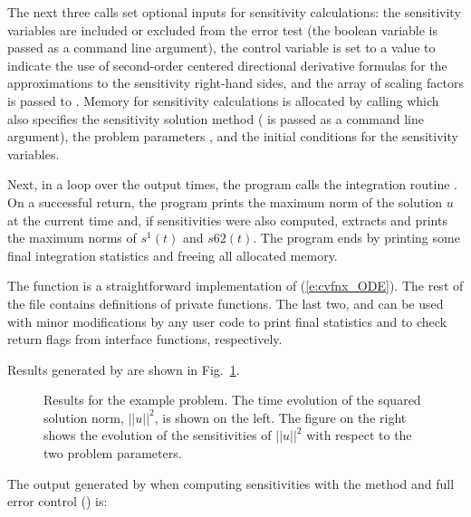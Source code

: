 The next three calls set optional inputs for sensitivity calculations: the sensitivity
variables are included or excluded from the error test (the boolean variable 
is passed as a command line argument), the control variable  is set to a value
 to indicate  the use of second-order centered directional derivative formulas
for the approximations to the sensitivity right-hand sides, and the array of
scaling factors  is passed to {\cvodes}.
Memory for sensitivity calculations is allocated by calling 
which also specifies the sensitivity solution method ( is passed
as a command line argument), the problem parameters , and the initial conditions
for the sensitivity variables.

Next, in a loop over the  output times, the program calls the integration
routine . On a successful return, the program prints the maximum norm
of the solution $u$ at the current time and, if sensitivities were also computed, 
extracts and prints the maximum norms of $s^1(t)$ and $s62(t)$.
The program ends by printing some final integration statistics and freeing all
allocated memory.

The  function is a straightforward implementation of (\ref{e:cvfnx_ODE}).
The rest of the file  contains definitions of private functions. 
The last two,  and  can be used with minor
modifications by any {\cvodes} user code to print final {\cvodes} statistics
and to check return flags from {\cvodes} interface functions, respectively.

Results generated by  are shown in Fig.~\ref{f:cvfnx}. 
\begin{figure}
  {\centerline{}}
  \caption[Results for the  example problem.]
  {Results for the  example problem.
    The time evolution of the squared solution norm, $||u||^2$, is shown on the left. 
    The figure on the right shows the evolution of the sensitivities of $||u||^2$
    with respect to the two problem parameters.}
  \label{f:cvfnx}
\end{figure}
The output generated by  when computing sensitivities with the 
method and full error control () is:

\vspace{0.1in}

